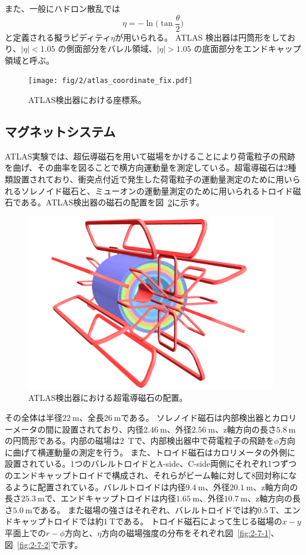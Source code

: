 また、一般にハドロン散乱では
\begin{equation}
    \eta=-\ln\bigg(\tan\frac{\theta}{2}\bigg)
    \label{ラピディティ}
\end{equation}
と定義される擬ラピディティ$\eta$が用いられる。
ATLAS 検出器は円筒形をしており、$|\eta| < 1.05$ の側面部分をバレル領域、$|\eta| > 1.05$ の底面部分をエンドキャップ領域と呼ぶ。

\begin{figure}[tb]
  \centering
  \texttt{[image: fig/2/atlas\_coordinate\_fix.pdf]}
  \caption{ATLAS検出器における座標系。}
  \label{fig:2-5}
\end{figure}

\newpage
\subsection{マグネットシステム}\label{section2-2-2}
ATLAS実験では、超伝導磁石を用いて磁場をかけることにより荷電粒子の飛跡を曲げ、その曲率を図ることで横方向運動量を測定している。超電導磁石は2種類設置されており、衝突点付近で発生した荷電粒子の運動量測定のために用いられるソレノイド磁石と、ミューオンの運動量測定のために用いられるトロイド磁石である。ATLAS検出器の磁石の配置を図~\ref{fig:2-6}に示す。

\begin{figure}[h]
  \centering
  \includegraphics[clip, width=11cm]{fig/2/ATLcoilGeom.pdf}
  \caption{ATLAS検出器における超電導磁石の配置。}
  \label{fig:2-6}
\end{figure}

その全体は半径$\SI{22}{\m}$、全長$\SI{26}{\m}$である。
ソレノイド磁石は内部検出器とカロリーメータの間に設置されており、内径$\SI{2.46}{\m}$、外径$\SI{2.56}{\m}$、z軸方向の長さ$\SI{5.8}{\m}$の円筒形である。内部の磁場は\SI{2}{\tesla}で、内部検出器中で荷電粒子の飛跡を$\phi$方向に曲げて横運動量の測定を行う。
また、トロイド磁石はカロリメータの外側に設置されている。1つのバレルトロイドとA-side、C-side両側にそれぞれ1つずつのエンドキャップトロイドで構成され、それらがビーム軸に対して8回対称になるように配置されている。バレルトロイドは内径$\SI{9.4}{\m}$、外径$\SI{20.1}{\m}$、z軸方向の長さ$\SI{25.3}{\m}$で、エンドキャップトロイドは内径$\SI{1.65}{\m}$、外径$\SI{10.7}{\m}$、z軸方向の長さ$\SI{5.0}{\m}$である。
また磁場の強さはそれぞれ、バレルトロイドでは約$\SI{0.5}{\tesla}$、エンドキャップトロイドでは約$\SI{1}{\tesla}$である。
トロイド磁石によって生じる磁場の$x-y$平面上での$r-\phi$方向と、$\eta$方向の磁場強度の分布をそれぞれ図~\ref{fig:2-7-1}、図~\ref{fig:2-7-2}で示す。

